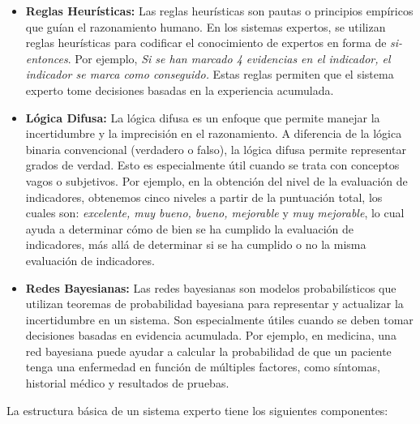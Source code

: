 \begin{itemize}
    \item \textbf{Reglas Heurísticas:} Las reglas heurísticas son pautas o
    principios empíricos que guían el razonamiento humano. En los sistemas
    expertos, se utilizan reglas heurísticas para codificar el conocimiento de
    expertos en forma de \textit{si-entonces}. Por ejemplo, \textit{Si se han marcado 4
    evidencias en el indicador, el indicador se marca como conseguido.} Estas
    reglas permiten que el sistema experto tome decisiones basadas en la
    experiencia acumulada.
    \item \textbf{Lógica Difusa:} La lógica difusa es un enfoque que permite
    manejar la incertidumbre y la imprecisión en el razonamiento. A diferencia
    de la lógica binaria convencional (verdadero o falso), la lógica difusa
    permite representar grados de verdad. Esto es especialmente útil cuando se
    trata con conceptos vagos o subjetivos. Por ejemplo, en la obtención del
    nivel de la evaluación de indicadores, obtenemos cinco niveles a partir de
    la puntuación total, los cuales son: \textit{excelente, muy bueno, bueno,
    mejorable} y \textit{muy mejorable}, lo cual ayuda a determinar cómo de
    bien se ha cumplido la evaluación de indicadores, más allá de determinar si
    se ha cumplido o no la misma evaluación de indicadores.
    \item \textbf{Redes Bayesianas:} Las redes bayesianas son modelos
    probabilísticos que utilizan teoremas de probabilidad bayesiana para
    representar y actualizar la incertidumbre en un sistema. Son especialmente
    útiles cuando se deben tomar decisiones basadas en evidencia acumulada. Por
    ejemplo, en medicina, una red bayesiana puede ayudar a calcular la
    probabilidad de que un paciente tenga una enfermedad en función de múltiples
    factores, como síntomas, historial médico y resultados de pruebas.    
\end{itemize}
La estructura básica de un sistema experto tiene los siguientes componentes:
